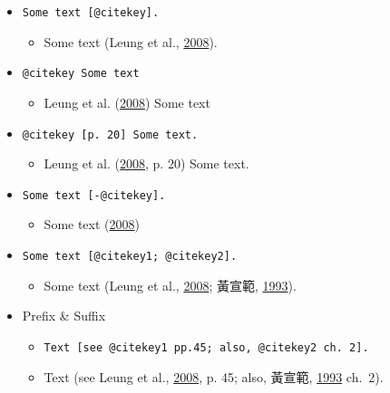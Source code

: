 \documentclass[oneside]{book}
\providecommand{\tightlist}{%
  \setlength{\itemsep}{0pt}\setlength{\parskip}{0pt}}
\begin{document}
\begin{itemize}
\tightlist
\item
  \texttt{Some\ text\ {[}@citekey{]}.}

  \begin{itemize}
  \tightlist
  \item
    Some text (Leung et al., \protect\hyperlink{ref-leung2008}{2008}).
  \end{itemize}
\item
  \texttt{@citekey\ Some\ text}

  \begin{itemize}
  \tightlist
  \item
    Leung et al. (\protect\hyperlink{ref-leung2008}{2008}) Some text
  \end{itemize}
\item
  \texttt{@citekey\ {[}p.\ 20{]}\ Some\ text.}

  \begin{itemize}
  \tightlist
  \item
    Leung et al. (\protect\hyperlink{ref-leung2008}{2008}, p. 20) Some text.
  \end{itemize}
\item
  \texttt{Some\ text\ {[}-@citekey{]}.}

  \begin{itemize}
  \tightlist
  \item
    Some text (\protect\hyperlink{ref-leung2008}{2008})
  \end{itemize}
\item
  \texttt{Some\ text\ {[}@citekey1;\ @citekey2{]}.}

  \begin{itemize}
  \tightlist
  \item
    Some text (Leung et al., \protect\hyperlink{ref-leung2008}{2008}; 黃宣範, \protect\hyperlink{ref-huangxuanfan1993}{1993}).
  \end{itemize}
\item
  Prefix \& Suffix

  \begin{itemize}
  \tightlist
  \item
    \texttt{Text\ {[}see\ @citekey1\ pp.45;\ also,\ @citekey2\ ch.\ 2{]}.}
  \item
    Text (see Leung et al., \protect\hyperlink{ref-leung2008}{2008}, p. 45; also, 黃宣範, \protect\hyperlink{ref-huangxuanfan1993}{1993} ch.~2).
  \end{itemize}
\end{itemize}
\end{document}
